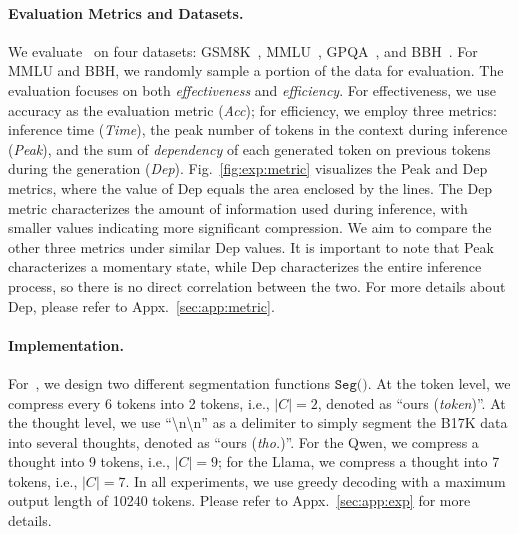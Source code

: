 \paragraph{Evaluation Metrics and Datasets.}
We evaluate \ours~on four datasets: GSM8K~\citep{arxiv21_gsm8k}, MMLU~\citep{iclr21_mmlu}, GPQA~\citep{colm24_gpqa}, and BBH~\citep{acl23_bbh}. 
For MMLU and BBH, we randomly sample a portion of the data for evaluation. 
The evaluation focuses on both \textit{effectiveness} and \textit{efficiency}. 
For effectiveness, we use accuracy as the evaluation metric (\textit{Acc}); 
for efficiency, we employ three metrics: inference time (\textit{Time}), the peak number of tokens in the context during inference (\textit{Peak}), and the sum of \textit{dependency} of each generated token on previous tokens during the generation (\textit{Dep}). 
Fig.~\ref{fig:exp:metric} visualizes the Peak and Dep metrics, where the value of Dep equals the area enclosed by the lines. 
The Dep metric characterizes the amount of information used during inference, with smaller values indicating more significant compression. 
We aim to compare the other three metrics under similar Dep values. 
It is important to note that Peak characterizes a momentary state, while Dep characterizes the entire inference process, so there is no direct correlation between the two. 
For more details about Dep, please refer to Appx.~\ref{sec:app:metric}.  

\paragraph{Implementation.}
For~\ours, we design two different segmentation functions $\texttt{Seg()}$. 
At the token level, we compress every 6 tokens into 2 tokens, i.e., $|C|=2$, denoted as ``ours (\textit{token})''. 
At the thought level, we use ``{\textbackslash n\textbackslash n}'' as a delimiter to simply segment the B17K data into several thoughts, denoted as ``ours (\textit{tho.})''. 
For the Qwen, we compress a thought into 9 tokens, i.e., $|C|=9$; 
for the Llama, we compress a thought into 7 tokens, i.e., $|C|=7$. 
In all experiments, we use greedy decoding with a maximum output length of 10240 tokens.
Please refer to Appx.~\ref{sec:app:exp} for more details.


